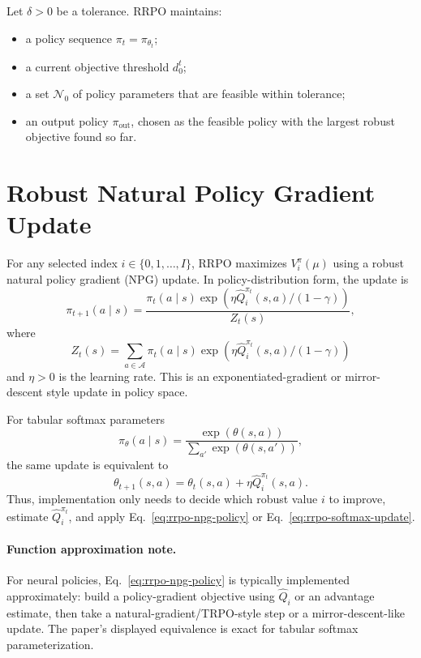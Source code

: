 \documentclass[11pt]{article}
\newcommand{\Aset}{\mathcal A}
\newcommand{\1}{\mathbf 1}
\begin{document}
Let $\delta>0$ be a tolerance.  RRPO maintains:
\begin{itemize}[leftmargin=2em]
    \item a policy sequence $\pi_t=\pi_{\theta_t}$;
    \item a current objective threshold $d_0^t$;
    \item a set $\mathcal N_0$ of policy parameters that are feasible within tolerance;
    \item an output policy $\pi_{\mathrm{out}}$, chosen as the feasible policy with the largest robust objective found so far.
\end{itemize}

\section{Robust Natural Policy Gradient Update}
For any selected index $i\in\{0,1,\ldots,I\}$, RRPO maximizes $V_i^\pi(\mu)$ using a robust natural policy gradient (NPG) update.  In policy-distribution form, the update is
\begin{equation}
    \pi_{t+1}(a\mid s)
    =\frac{\pi_t(a\mid s)\exp\!\left(\eta\widehat Q_i^{\pi_t}(s,a)/(1-\gamma)\right)}
    {Z_t(s)},
    \label{eq:rrpo-npg-policy}
\end{equation}
where
\begin{equation}
    Z_t(s)=\sum_{a\in\Aset}\pi_t(a\mid s)
    \exp\!\left(\eta\widehat Q_i^{\pi_t}(s,a)/(1-\gamma)\right)
\end{equation}
and $\eta>0$ is the learning rate.  This is an exponentiated-gradient or mirror-descent style update in policy space.

For tabular softmax parameters
\begin{equation}
    \pi_\theta(a\mid s)=\frac{\exp(\theta(s,a))}{\sum_{a'}\exp(\theta(s,a'))},
\end{equation}
the same update is equivalent to
\begin{equation}
    \theta_{t+1}(s,a)=\theta_t(s,a)+\eta\widehat Q_i^{\pi_t}(s,a).
    \label{eq:rrpo-softmax-update}
\end{equation}
Thus, implementation only needs to decide which robust value $i$ to improve, estimate $\widehat Q_i^{\pi_t}$, and apply Eq.~\eqref{eq:rrpo-npg-policy} or Eq.~\eqref{eq:rrpo-softmax-update}.

\paragraph{Function approximation note.}
For neural policies, Eq.~\eqref{eq:rrpo-npg-policy} is typically implemented approximately: build a policy-gradient objective using $\widehat Q_i$ or an advantage estimate, then take a natural-gradient/TRPO-style step or a mirror-descent-like update.  The paper's displayed equivalence is exact for tabular softmax parameterization.
\end{document}
